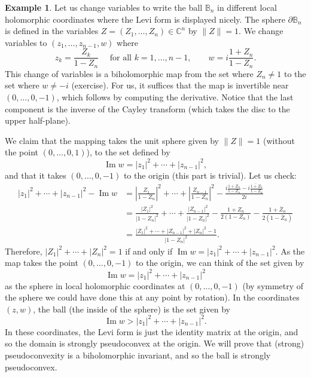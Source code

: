 \documentclass[12pt,openany]{book}
\renewcommand{\Im}{\operatorname{Im}}
\newcommand{\sabs}[1]{\lvert {#1} \rvert}
\newcommand{\snorm}[1]{\lVert {#1} \rVert}
\newcommand{\abs}[1]{\left\lvert {#1} \right\rvert}
\newcommand{\C}{{\mathbb{C}}}
\newcommand{\bB}{{\mathbb{B}}}
\theoremstyle{plain}
\theoremstyle{remark}
\theoremstyle{definition}
\theoremstyle{exercise}
\theoremstyle{example}
\newtheorem{example}[thm]{Example}
\begin{document}
\begin{example}
Let us change variables to write the ball $\bB_n$ in different
local holomorphic coordinates where the Levi form is displayed nicely.
The sphere $\partial \bB_n$ is defined in the variables $Z = (Z_1,\ldots,Z_n) \in \C^n$
by $\snorm{Z} = 1$.
We change variables to $(z_1,\ldots,z_{n-1},w)$ where
\begin{equation*}
z_k = \frac{Z_k}{1-Z_n} \quad \text{ for all $k=1,\ldots,n-1$}, \qquad
w = i\frac{1+Z_n}{1-Z_n} .
\end{equation*}
This change of variables is a biholomorphic map from the set where $Z_n \neq 1$
to the set where $w\neq -i$ (exercise).  For us, it suffices
that the map is invertible near
$(0,\ldots,0,-1)$, which follows by computing the derivative.
Notice
that the last component is the inverse of the Cayley transform (which takes
the disc to the upper half-plane).

We claim that the mapping takes the unit sphere given by $\snorm{Z} = 1$
(without the point $(0,\ldots,0,1)$), to
the set defined by
\begin{equation*}
\Im w = \sabs{z_1}^2 + \cdots + \sabs{z_{n-1}}^2 ,
\end{equation*}
and that it takes $(0,\ldots,0,-1)$ to the origin (this part is trivial).
Let us check:
\begin{equation*}
\begin{split}
\sabs{z_1}^2 + \cdots + \sabs{z_{n-1}}^2 - \Im w
& =
\abs{\frac{Z_1}{1-Z_n}}^2
+ \cdots +
\abs{\frac{Z_{n-1}}{1-Z_n}}^2
-
\frac{
i\frac{1+Z_n}{1-Z_n} -
\overline{
i\frac{1+Z_n}{1-Z_n}}
}{2i}
\\
& =
\frac{\sabs{Z_1}^2}{\sabs{1-Z_n}^2}
+ \cdots +
\frac{\sabs{Z_{n-1}}^2}{\sabs{1-Z_n}^2}
-
\frac{1+Z_n}{2(1-Z_n)} -
\frac{1+\bar{Z}_n}{2(1-\bar{Z}_n)}
\\
& =
\frac{\sabs{Z_1}^2
+ \cdots +
\sabs{Z_{n-1}}^2
+
\sabs{Z_n}^2-1}{\sabs{1-Z_n}^2} .
\end{split}
\end{equation*}
Therefore, $\sabs{Z_1}^2 + \cdots + \sabs{Z_n}^2 = 1$ if and only if $\Im w =
\sabs{z_1}^2 + \cdots + \sabs{z_{n-1}}^2$.
As the map takes the point $(0,\ldots,0,-1)$ to the origin, we can
think of the set given by
\begin{equation*}
\Im w = \sabs{z_1}^2 + \cdots + \sabs{z_{n-1}}^2
\end{equation*}
as the sphere in local holomorphic coordinates at $(0,\ldots,0,-1)$ (by symmetry
of the sphere we could have done this at any point by rotation).
In the coordinates $(z,w)$, the ball (the inside of the sphere) is the set given by
\begin{equation*}
\Im w > \sabs{z_1}^2 + \cdots + \sabs{z_{n-1}}^2 .
\end{equation*}
In these coordinates, the Levi form is just the identity matrix at the
origin, and so the domain is strongly pseudoconvex at the origin.
We will prove that (strong) pseudoconvexity is a biholomorphic invariant,
and so the ball is strongly pseudoconvex.


\end{example}
\end{document}
